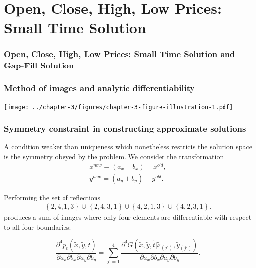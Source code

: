 \documentclass{beamer}
\begin{document}
\section{Open, Close, High, Low Prices: Small Time Solution}
\begin{frame}
\frametitle{Open, Close, High, Low Prices: Small Time Solution and Gap-Fill Solution}
\end{frame}
\begin{frame}
  \frametitle{Method of images and analytic differentiability}
  \centering
  \texttt{[image: ../chapter-3/figures/chapter-3-figure-illustration-1.pdf]}
\end{frame}
\begin{frame}
  \frametitle{Symmetry constraint in constructing approximate solutions}

  A condition weaker than uniqueness which nonetheless restricts the
solution space is the symmetry obeyed by the problem. We consider the transformation
\begin{align*}
  x^{new} = (a_x + b_x) - x^{old}, \\
  y^{new} = (a_y + b_y) - y^{old}.
\end{align*}

Performing the set of reflections
\begin{align*}
  \left\{ 2,4,1,3 \right\} \cup \left\{ 2,4,3,1 \right\} \cup \left\{ 4,2,1,3 \right\} \cup \left\{ 4,2,3,1 \right\}. 
\end{align*}
produces a sum of images where only four elements are differentiable
with respect to all four boundaries:

\[
  \frac{\partial^4 p_\epsilon(\tilde{x}, \tilde{y}, \tilde{t})}{\partial a_x \partial b_x \partial a_y \partial b_y}  = \sum_{j'=1}^{4}
                                                                                                                        \frac{\partial^4G(\tilde{x},\tilde{y},\tilde{t}|\tilde{x}_{(j')},\tilde{y}_{(j')})}{\partial a_x \partial b_x \partial a_y \partial b_y}.
\]

\end{frame}
\end{document}
